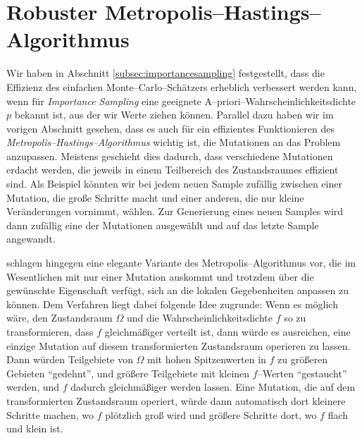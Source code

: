 	\section{Robuster Metropolis--Hastings--Algorithmus}\label{sec:robustmetropolis}
	Wir haben in Abschnitt \ref{subsec:importancesampling} festgestellt, dass die Effizienz des einfachen Monte--Carlo--Schätzers erheblich verbessert werden kann, wenn für {\em Importance Sampling} eine geeignete A--priori--Wahrscheinlichkeitsdichte $p$ bekannt ist, aus der wir Werte ziehen können. Parallel dazu haben wir im vorigen Abschnitt gesehen, dass es auch für ein effizientes Funktionieren des {\em Metropolis--Hastings--Algorithmus} wichtig ist, die Mutationen an das Problem anzupassen. Meistens geschieht dies dadurch, dass verschiedene Mutationen erdacht werden, die jeweils in einem Teilbereich des Zustandsraumes effizient sind. Als Beispiel könnten wir bei jedem neuen Sample zufällig zwischen einer Mutation, die große Schritte macht und einer anderen, die nur kleine Veränderungen vornimmt, wählen. Zur Generierung eines neuen Samples wird dann zufällig eine der Mutationen ausgewählt und auf das letzte Sample angewandt.
	
	\citet{Kelemen:2002p8514} schlagen hingegen eine elegante Variante des Metropolis--Algorithmus vor, die im Wesentlichen mit nur einer Mutation auskommt und trotzdem über die gewünschte Eigenschaft verfügt, sich an die lokalen Gegebenheiten anpassen zu können. Dem Verfahren liegt dabei folgende Idee zugrunde: Wenn es möglich wäre, den Zustandsraum $\Omega$ und die Wahrscheinlichkeitsdichte $f$ so zu transformieren, dass $f$ gleichmäßiger verteilt ist, dann würde es ausreichen, eine einzige Mutation auf diesem transformierten Zustandsraum operieren zu lassen. Dann würden Teilgebiete von $\Omega$ mit hohen Spitzenwerten in $f$ zu größeren Gebieten ``gedehnt'', und größere Teilgebiete mit kleinen $f$--Werten ``gestaucht'' werden, und $f$ dadurch gleichmäßiger werden lassen. Eine Mutation, die auf dem transformierten Zustandsraum operiert, würde dann automatisch dort kleinere Schritte machen, wo $f$ plötzlich groß wird und größere Schritte dort, wo $f$ flach und klein ist.
	
